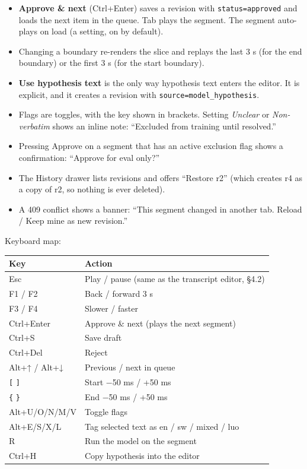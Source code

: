 \documentclass[11pt]{article}
\begin{document}
\begin{itemize}
\tightlist
\item
  \textbf{Approve \& next} (Ctrl+Enter) saves a revision with \texttt{status=\allowbreak{}approved} and loads the next item in the queue. Tab plays the segment. The segment auto-plays on load (a setting, on by default).
\item
  Changing a boundary re-renders the slice and replays the last 3 s (for the end boundary) or the first 3 s (for the start boundary).
\item
  \textbf{Use hypothesis text} is the only way hypothesis text enters the editor. It is explicit, and it creates a revision with \texttt{source=\allowbreak{}model\_\allowbreak{}hypothesis}.
\item
  Flags are toggles, with the key shown in brackets. Setting \emph{Unclear} or \emph{Non-verbatim} shows an inline note: ``Excluded from training until resolved.''
\item
  Pressing Approve on a segment that has an active exclusion flag shows a confirmation: ``Approve for eval only?''
\item
  The History drawer lists revisions and offers ``Restore r2'' (which creates r4 as a copy of r2, so nothing is ever deleted).
\item
  A 409 conflict shows a banner: ``This segment changed in another tab. Reload / Keep mine as new revision.''
\end{itemize}

Keyboard map:

\begin{longtable}[]{@{}>{\raggedright\arraybackslash}p{}>{\raggedright\arraybackslash}p{}@{}}
\toprule\noalign{}
Key & Action \\
\midrule\noalign{}
\endhead
\bottomrule\noalign{}
\endlastfoot
Esc & Play / pause (same as the transcript editor, §4.2) \\
F1 / F2 & Back / forward 3 s \\
F3 / F4 & Slower / faster \\
Ctrl+Enter & Approve \& next (plays the next segment) \\
Ctrl+S & Save draft \\
Ctrl+Del & Reject \\
Alt+↑ / Alt+↓ & Previous / next in queue \\
\texttt{[} \texttt{]} & Start −50 ms / +50 ms \\
\texttt{\{} \texttt{\}} & End −50 ms / +50 ms \\
Alt+U/O/N/M/V & Toggle flags \\
Alt+E/S/X/L & Tag selected text as en / sw / mixed / luo \\
R & Run the model on the segment \\
Ctrl+H & Copy hypothesis into the editor \\
\end{longtable}
\end{document}
